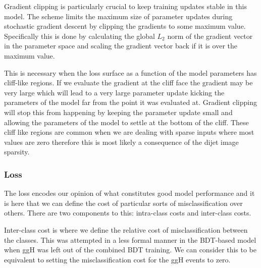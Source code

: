 Gradient clipping is particularly crucial to keep training updates stable in this model. 
The scheme limits the maximum size of parameter updates during stochastic gradient descent by clipping the gradients to some maximum value. 
Specifically this is done by calculating the global $L_2$ norm of the gradient vector in the parameter space and scaling the gradient vector back if it is over the maximum value.  

This is necessary when the loss surface as a function of the model parameters has cliff-like regions. If we evaluate the gradient at the cliff face the gradient may be very large which will lead to a very large parameter update kicking the parameters of the model far from the point it was evaluated at. Gradient clipping will stop this from happening by keeping the parameter update small and allowing the parameters of the model to settle at the bottom of the cliff. These cliff like regions are common when we are dealing with sparse inputs where most values are zero therefore this is most likely a consequence of the dijet image sparsity. 



\subsubsection{Loss}
The loss encodes our opinion of what constitutes good model performance and it is here that we can define the cost of particular sorts of misclassification over others. 
There are two components to this: intra-class costs and inter-class costs. 

Inter-class cost is where we define the relative cost of misclassification between the classes. 
This was attempted in a less formal manner in the BDT-based model when ggH was left out of the combined BDT training. 
We can consider this to be equivalent to setting the misclassification cost for the ggH events to zero. 

